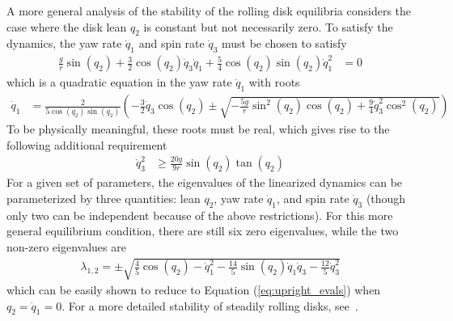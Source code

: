 \documentclass[smallcondensed,final]{svjour3}                     %
\begin{document}
A more general analysis of the stability of the rolling disk equilibria
considers the case where the disk lean $q_2$ is constant but not necessarily
zero. To satisfy the dynamics, the yaw rate $\dot{q}_1$ and spin rate
$\dot{q}_3$ must be chosen to satisfy
\begin{align}
  \frac{g}{r}\sin{(q_2)}  + \frac{3}{2}\cos{(q_2)} \dot{q}_3 \dot{q}_1 +
  \frac{5}{4}\cos{(q_2)}\sin{(q_2)} \dot{q}_1^2
 &= 0
\end{align}
which is a quadratic equation in the yaw rate $\dot{q}_1$ with roots
\begin{align}
\dot{q}_1 &= \frac{2}{5\cos\left(q_{2}\right) \sin\left(q_{2}\right)} \left( - \frac{3}{2} \dot{q}_{3}\cos\left(q_{2}\right) \pm \sqrt{- \frac{5 g}{r} \sin^{2}\left(q_{2}\right) \cos\left(q_{2}\right) + \frac{9}{4} \dot{q}_{3}^{2} \cos^{2}\left(q_{2}\right)} \right)
\end{align}
To be physically meaningful, these roots must be real, which gives rise to the following additional requirement
\begin{align}
  \dot{q}_3^2 &\geq \frac{20g}{9r}\sin{(q_2)} \tan{(q_2)}
\end{align}
For a given set of parameters, the eigenvalues of the linearized dynamics can be
parameterized by three quantities: lean $q_2$, yaw rate $\dot{q}_1$, and spin
rate $\dot{q}_3$ (though only two can be independent because of the above
restrictions). For this more general equilibrium condition, there are still six
zero eigenvalues, while the two non-zero eigenvalues are
\begin{align}
\lambda_{1,2} = \pm\sqrt{\frac{4}{5} \cos\left(q_{2}\right) - \dot{q}_{1}^{2} -\frac{14}{5} \sin\left(q_{2}\right) \dot{q}_{1} \dot{q}_{3} - \frac{12}{5}\dot{q}_{3}^{2}}
\end{align}
which can be easily shown to reduce to Equation (\ref{eq:upright_evals}) when
$q_2 = \dot{q}_1 = 0$. For a more detailed stability of steadily rolling disks,
see~\cite{O'Reilly1996,Neimark1972,Kuleshov2001}.
\end{document}
